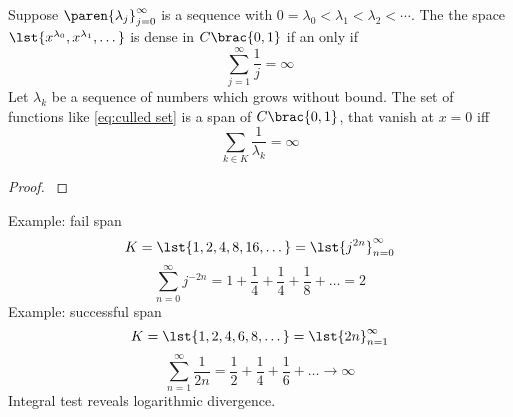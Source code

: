 % 

%
\begin{theorem}

Suppose $\paren{\lambda_{j}}_{j=0}^{\infty}$ is a sequence with $0 = \lambda_{0} <\lambda_{1} < \lambda_{2} < \cdots$. The the space $\lst{x^{\lambda_{0}}, x^{\lambda_{1}},\dots}$ is dense in $C\brac{0,1}$ if an only if 
\begin{equation}
	\sum_{j=1}^{\infty} \frac{1}{j} = \infty
\end{equation} 
Let $\lambda_{k}$ be a sequence of numbers which grows without bound. The set of functions like \eqref{eq:culled set} is a span of $C\brac{0,1}$, that vanish at $x=0$ iff 
%
\begin{equation*}
	\sum_{k\in K} \frac{1}{\lambda_{k}} = \infty
\end{equation*}
%
\label{thm:muntz}
\end{theorem}
\begin{proof}
%
\cite[p. 89]{lax2002functional}
%
\end{proof}

Example: fail span
%
\begin{equation*}
	K=\lst{1,2,4,8,16,\dots} = \lst{j^{2n}}_{n=0}^{\infty}
\end{equation*}
%
%
\begin{equation*}
	\sum_{n=0}^{\infty} j^{-2n} = 1 + \frac{1}{4} + \frac{1}{4} + \frac{1}{8} + \dots = 2
\end{equation*}
%
Example: successful span
%
\begin{equation*}
	K=\lst{1,2,4,6,8,\dots} = \lst{2n}_{n=1}^{\infty}
\end{equation*}
%
%
\begin{equation*}
	\sum_{n=1}^{\infty} \frac{1}{2n} = 
	\frac{1}{2} + \frac{1}{4} + \frac{1}{6} + \dots \to \infty
\end{equation*}
Integral test reveals logarithmic divergence.


\endinput %